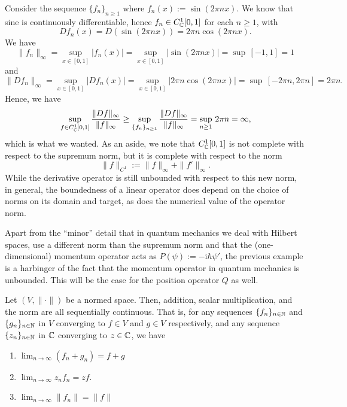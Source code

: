 \begin{example}
Consider the sequence $\{f_n\}_{n\geq 1}$ where $f_n(x):=\sin(2\pi nx)$. We know that sine is continuously differentiable, hence $f_n\in C^1_{\mathbb{C}}[0,1]$ for each $n\geq 1$, with
\begin{equation*}
Df_n(x) = D(\sin(2\pi nx)) = 2\pi n\cos(2\pi nx).
\end{equation*}
We have
\begin{equation*}
\|f_n\|_{\infty} = \sup_{x\in[0,1]}|f_n(x)| = \sup_{x\in[0,1]}|\sin(2\pi nx)| = \sup \, [-1,1] = 1 
\end{equation*}
and
\begin{equation*}
\|Df_n\|_{\infty} = \sup_{x\in[0,1]}|Df_n(x)| = \sup_{x\in[0,1]}|2\pi n\cos(2\pi nx)| = \sup\, [-2\pi n,2\pi n] = 2\pi n.
\end{equation*}
Hence, we have
\begin{equation*}
\sup_{f\in C^1_{\mathbb{C}}[0,1]} \frac{\|Df\|_{\infty}}{\|f\|_{\infty}} \geq \sup_{\{f_n\}_{n\geq 1}} \frac{\|Df\|_{\infty}}{\|f\|_{\infty}} = \sup_{n\geq 1}\,2\pi n = \infty,
\end{equation*}
which is what we wanted. As an aside, we note that $C^1_{\mathbb{C}}[0,1]$ is not complete with respect to the supremum norm, but it is complete with respect to the norm
\begin{equation*}
\|f\|_{C^1}:=\|f\|_{\infty}+\|f'\|_{\infty}.
\end{equation*}
While the derivative operator is still unbounded with respect to this new norm, in general, the boundedness of a linear operator does depend on the choice of norms on its domain and target, as does the numerical value of the operator norm.
\end{example}

\begin{remark}
Apart from the ``minor'' detail that in quantum mechanics we deal with Hilbert spaces, use a different norm than the supremum norm and that the (one-dimensional) momentum operator acts as $P(\psi):=-\mathrm{i}\hbar\psi'$, the previous example is a harbinger of the fact that the momentum operator in quantum mechanics is unbounded. This will be the case for the position operator $Q$ as well.
\end{remark}

\begin{lemma}
\label{lem:forcompl}
Let $(V,\|\cdot\|)$ be a normed space. Then, addition, scalar
multiplication, and the norm are all sequentially continuous. That is,
for any sequences $\{f_n\}_{n\in \mathbb{N}}$ and $\{g_n\}_{n\in \mathbb{N}}$ in $V$
converging to $f\in V$ and $g\in V$ respectively, and any sequence
$\{z_n\}_{n\in \mathbb{N}}$ in $\mathbb{C}$ converging to $z\in \mathbb{C}$, we have
\begin{enumerate}[label=(\roman*)]
\item $\displaystyle \lim_{n\to \infty}(f_n+g_n)=f+g$
\item $\displaystyle \lim_{n\to \infty}z_nf_n=zf$.
\item $\displaystyle \lim_{n\to \infty}\|f_n\|=\|f\|$
\end{enumerate}
\end{lemma}

